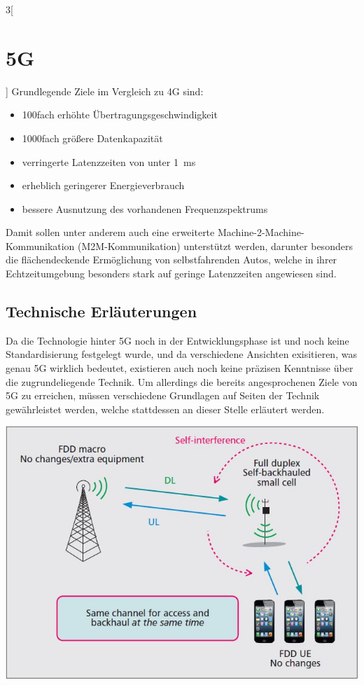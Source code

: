 \begin{multicols}{3}[\section{5G}]
Grundlegende Ziele im Vergleich zu 4G sind:\cite{5g.6}
\begin{itemize}
\item \si{100}fach erhöhte Übertragungsgeschwindigkeit
\item \si{1000}fach größere Datenkapazität
\item verringerte Latenzzeiten von unter \SI{1}{\milli\second}
\item erheblich geringerer Energieverbrauch 
\item bessere Ausnutzung des vorhandenen Frequenzspektrums
\end{itemize}
Damit sollen unter anderem auch eine erweiterte Machine-2-Machine-Kommunikation (M2M-Kommunikation) unterstützt werden, darunter besonders die flächendeckende Ermöglichung von selbstfahrenden Autos, welche in ihrer Echtzeitumgebung besonders stark auf geringe Latenzzeiten angewiesen sind. \cite{5g.1}
\subsection*{Technische Erläuterungen}
Da die Technologie hinter 5G noch in der Entwicklungsphase ist und noch keine Standardisierung festgelegt wurde, und da verschiedene Ansichten exisitieren, was genau 5G wirklich bedeutet, existieren auch noch keine präzisen Kenntnisse über die zugrundeliegende Technik.
Um allerdings die bereits angesprochenen Ziele von 5G zu erreichen, müssen verschiedene Grundlagen auf Seiten der Technik gewährleistet werden, welche stattdessen an dieser Stelle erläutert werden.

\begin{Figure}
\includegraphics[width=\linewidth]{Kapitel/5G/Grafiken/sic}
\label{fig:5g.sic}
\end{Figure}


\end{multicols}
